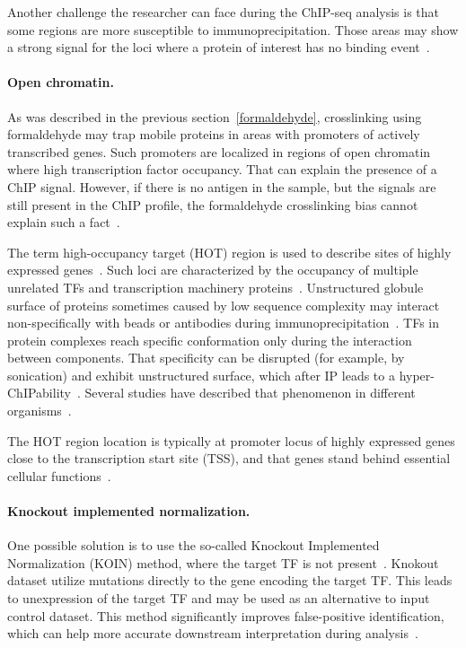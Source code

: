 Another challenge the researcher can face during the ChIP-seq analysis is that some regions are more susceptible to immunoprecipitation. 
Those areas may show a strong signal for the loci where a protein of interest has no binding event~\cite{teytelman2013highly}.

\paragraph{Open chromatin.}
As was described in the previous section~\ref{formaldehyde}, crosslinking using formaldehyde may trap mobile proteins in areas with promoters of actively transcribed genes. 
Such promoters are localized in regions of open chromatin where high transcription factor occupancy.  
That can explain the presence of a ChIP signal. 
However, if there is no antigen in the sample, but the signals are still present in the ChIP profile, the formaldehyde crosslinking bias cannot explain such a fact~\cite{jain2015active}.

The term high-occupancy target (HOT) region is used to describe sites of highly expressed genes~\cite{teytelman2013highly}.  
Such loci are characterized by the occupancy of multiple unrelated TFs and transcription machinery proteins~\cite{boyle2014comparative}. 
Unstructured globule surface of proteins sometimes caused by low sequence complexity may interact non-specifically with beads or antibodies during immunoprecipitation~\cite{teytelman2013highly}.
TFs in protein complexes reach specific conformation only during the interaction between components. 
That specificity can be disrupted (for example, by sonication) and exhibit unstructured surface, which after IP leads to a hyper-ChIPability~\cite{jain2015active}.
Several studies have described that phenomenon in different organisms~\cite{boyle2014comparative, fan2009does, krebs2014optimization, teytelman2013highly,   waldminghaus2010chip, xie2013dynamic}.

The HOT region location is typically at promoter locus of highly expressed genes close to the transcription start site (TSS), and that genes stand behind essential cellular functions~\cite{wreczycka2019hot}. 

\paragraph{Knockout implemented normalization.}
One possible solution is to use the so-called Knockout Implemented Normalization (KOIN) method, where the target TF is not present~\cite{krebs2014optimization}.
Knokout dataset utilize mutations directly to the gene encoding the target TF.
This leads to unexpression of the target TF and may be used as an alternative to input control dataset.
This method significantly improves false-positive identification, which can help more accurate downstream interpretation during analysis~\cite{wreczycka2019hot}.

